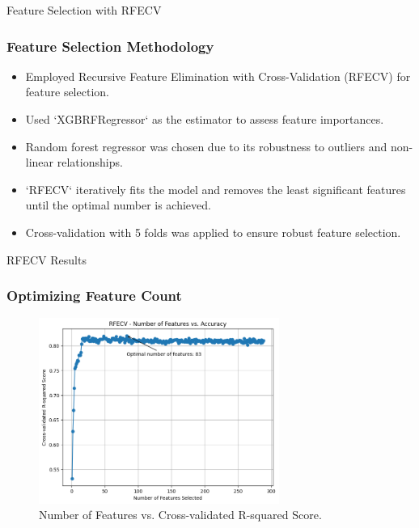 \begin{frame}{Feature Selection with RFECV}
    \frametitle{Feature Selection Methodology}
    \begin{itemize}
        \item Employed Recursive Feature Elimination with Cross-Validation (RFECV) for feature selection.
        \item Used `XGBRFRegressor` as the estimator to assess feature importances.
        \item Random forest regressor was chosen due to its robustness to outliers and non-linear relationships.
        \item `RFECV` iteratively fits the model and removes the least significant features until the optimal number is achieved.
        \item Cross-validation with 5 folds was applied to ensure robust feature selection.
    \end{itemize}
\end{frame}

\begin{frame}{RFECV Results}
    \frametitle{Optimizing Feature Count}
    \begin{figure}
        \includegraphics[width=0.7\textwidth]{figures/n_features_vs_score.png} 
        \caption{Number of Features vs. Cross-validated R-squared Score.}
        \label{fig:rfecv_plot}
    \end{figure}
\end{frame}

